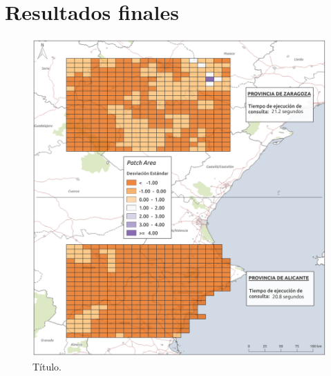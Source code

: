 \chapter{Resultados finales}\label{anex:results}

\begin{figure}
\begin{center}
\includegraphics[width=\textwidth]{ResultadosyDiscusion/Figs/Results/p_25.png}
\caption{Título. \label{fig:p_25}}
\end{center}
\end{figure}

